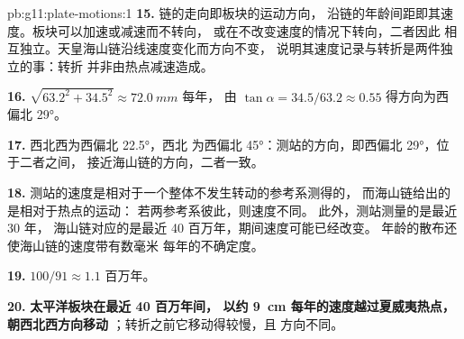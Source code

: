 \begin{solution}{pb:g11:plate-motions:1}
\textbf{15.} 链的走向即板块的运动方向，
沿链的年龄间距即其速度。板块可以加速或减速而不转向，
或在不改变速度的情况下转向，二者因此
相互独立。天皇海山链沿线速度变化而方向不变，
说明其速度记录与转折是两件独立的事：转折
并非由热点减速造成。

\textbf{16.} $\sqrt{63.2^2 + 34.5^2} \approx \qty{72.0}{mm}$ 每年，
由 $\tan\alpha = 34.5/63.2 \approx 0.55$ 得方向为西偏北 \ang{29}。

\textbf{17.} 西北西为西偏北 \ang{22.5}，西北
为西偏北 \ang{45}：测站的方向，即西偏北 \ang{29}，位于二者之间，
接近海山链的方向，二者一致。

\textbf{18.} 测站的速度是相对于一个整体不发生转动的参考系测得的，
而海山链给出的是相对于热点的运动：
若两参考系彼此，则速度不同。
此外，测站测量的是最近 30 年，
海山链对应的是最近 40 百万年，期间速度可能已经改变。
年龄的散布还使海山链的速度带有数毫米
每年的不确定度。

\textbf{19.} $100/91 \approx 1.1$ 百万年。

\textbf{20.} \textbf{太平洋板块在最近 40 百万年间，
以约 \qty{9}{cm} 每年的速度越过夏威夷热点，朝西北西方向移动}
；转折之前它移动得较慢，且
方向不同。
\end{solution}
